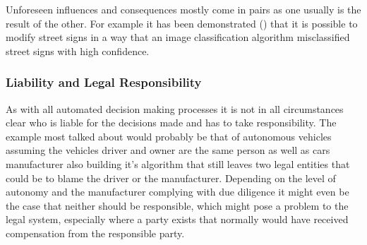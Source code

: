 Unforeseen influences and consequences mostly come in pairs
as one usually is the result of the other.
For example it has been demonstrated (\cite{Eykholt2017})
that it is possible to modify street signs in a way 
that an image classification algorithm misclassified 
street signs with high confidence. 

\subsubsection{Liability and Legal Responsibility}

As with all automated decision making processes 
it is not in all circumstances clear who is liable for 
the decisions made and has to take responsibility.
The example most talked about would probably be 
that of autonomous vehicles assuming the vehicles driver and owner are the same person as well as cars manufacturer also building it's algorithm that still leaves two legal entities that could  be to blame the driver or the manufacturer.
Depending on the level of autonomy and the manufacturer complying with due diligence it might even be the case that neither should be responsible, which might pose a problem to the legal system, especially where a party exists that normally would have received compensation from the responsible party.
